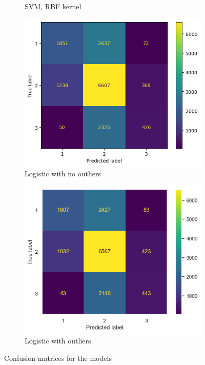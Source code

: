 \documentclass{article}
\begin{document}
\begin{figure}[!htpb]
\begin{subfigure}{0.49\textwidth}
    \caption{SVM, RBF kernel}
\end{subfigure}
\begin{subfigure}{0.49\textwidth}
    \includegraphics[width=\textwidth]{logisticNoOutliers.png}
    \caption{Logistic with no outliers}
\end{subfigure}
\begin{subfigure}{0.49\textwidth}
    \includegraphics[width=\textwidth]{logisticWithOutliers.png}
    \caption{Logistic with outliers}
\end{subfigure}
\caption{Confusion matrices for the models}
\end{figure}
\clearpage
\end{document}
